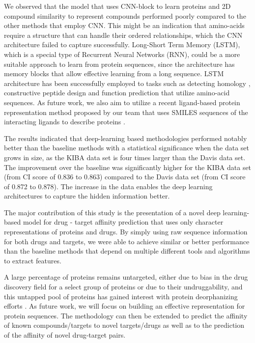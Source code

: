 \documentclass[11pt,letterpaper]{article}
\begin{document}
We  observed that the model that uses CNN-block to learn proteins and 2D compound similarity to represent compounds performed poorly compared to the other methods that employ CNN.  This might be an indication that amino-acids  require a structure that can handle their ordered relationships, which the CNN architecture failed to capture successfully. Long-Short Term Memory (LSTM), which is a special type of Recurrent Neural Networks (RNN), could be a more suitable approach to learn from protein sequences, since the architecture has memory blocks that allow effective learning from a long sequence. LSTM architecture has been successfully employed to tasks such as  detecting homology \cite{hochreiter2007fast}, constructive peptide design \cite{muller2018recurrent}  and function prediction \cite{liu2017deep} that utilize amino-acid sequences. As future work, we also aim to utilize a recent ligand-based protein representation method proposed by our team that uses SMILES sequences of the interacting ligands to describe proteins \cite{ozturk2018novel} .

The results indicated that deep-learning based methodologies performed notably better than the baseline methods with a statistical significance when the data set grows in size, as the KIBA data set is four times larger than the Davis data set. The improvement over the baseline was significantly higher for the KIBA data set (from CI score of 0.836 to 0.863) compared to the Davis data set (from CI score of 0.872 to 0.878). The increase in the data enables the deep learning architectures to capture the hidden information better. 

The major contribution of this study is the presentation of a novel deep learning-based model for drug - target affinity prediction that  uses only character representations of  proteins and drugs. By simply using raw sequence information for both drugs and targets, we were able to achieve similar or better performance than the baseline methods that depend on  multiple different tools and algorithms to extract features.   

A large percentage of proteins remains untargeted, either due to bias in the drug discovery field for a select group of proteins or due to their undruggability, and this untapped pool of proteins has gained interest with protein deorphanizing efforts \cite{edwards2011too, o2016ligand,fedorov2010targeted}. As future work, we will focus on building an effective representation for protein sequences. The methodology can then be extended to predict the affinity of known compounds/targets to novel targets/drugs as well as to the prediction of the affinity of  novel drug-target pairs.
\end{document}

